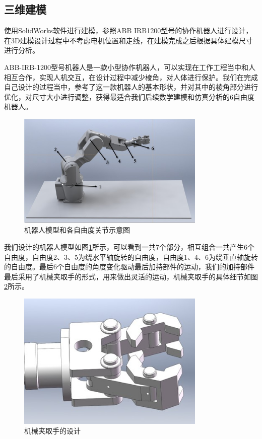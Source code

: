 \subsection{三维建模}
使用SolidWorks软件进行建模，参照ABB IRB1200型号的协作机器人进行设计，在3D建模设计过程中不考虑电机位置和走线，在建模完成之后根据具体建模尺寸进行分析。

ABB-IRB-1200型号机器人是一款小型协作机器人，可以实现在工作工程当中和人相互合作，实现人机交互，在设计过程中减少棱角，对人体进行保护。我们在完成自己设计的过程当中，参考了这一款机器人的基本形状，并对其中的棱角部分进行优化，对尺寸大小进行调整，获得最适合我们后续数学建模和仿真分析的6自由度机器人。

\begin{figure}[h]
    \centering
    \includegraphics[width=0.8\textwidth]{Image/fig1.jpg}
    \caption{机器人模型和各自由度关节示意图}
    \label{fig:1}    
\end{figure}

我们设计的机器人模型如图\ref{fig:1}所示，可以看到一共7个部分，相互组合一共产生6个自由度，自由度2、3、5为绕水平轴旋转的自由度，自由度1、4、6为绕垂直轴旋转的自由度。最后6个自由度的角度变化驱动最后加持部件的运动，我们的加持部件最后采用了机械夹取手的形式，用来做出灵活的运动，机械夹取手的具体细节如图\ref{fig:2}所示。

\begin{figure}[h]
    \centering
    \includegraphics[width=0.8\textwidth]{Image/fig2.jpg}
    \caption{机械夹取手的设计}
    \label{fig:2}
\end{figure}

